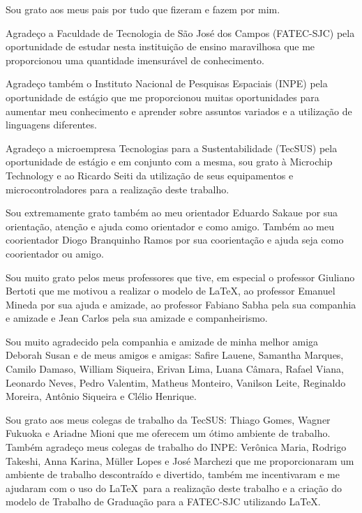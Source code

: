 \begin{agradecimentos}
\par Sou grato aos meus pais por tudo que fizeram e fazem por mim.
\par Agrade\c{c}o a Faculdade de Tecnologia de S\~ao Jos\'e dos Campos (FATEC-SJC) pela oportunidade de estudar nesta institui\c{c}\~ao de ensino maravilhosa que me proporcionou uma quantidade imensur\'avel de conhecimento.

\par Agrade\c{c}o tamb\'em o Instituto Nacional de Pesquisas Espaciais (INPE) pela oportunidade de est\'agio que me proporcionou muitas oportunidades para aumentar meu conhecimento e aprender sobre assuntos variados e a utiliza\c{c}\~ao de linguagens diferentes.

\par Agrade\c{c}o a microempresa Tecnologias para a Sustentabilidade (TecSUS) pela oportunidade de est\'agio e em conjunto com a mesma, sou grato \`a Microchip Technology e ao Ricardo Seiti da utiliza\c{c}\~ao de seus equipamentos e microcontroladores para a realiza\c{c}\~ao deste trabalho.

\par Sou extremamente grato tamb\'em ao meu orientador Eduardo Sakaue por sua orienta\c{c}\~ao, aten\c{c}\~ao e ajuda como orientador e como amigo. Tamb\'em ao meu coorientador Diogo Branquinho Ramos por sua coorienta\c{c}\~ao e ajuda seja como coorientador ou amigo.

\par Sou muito grato pelos meus professores que tive, em especial o professor Giuliano Bertoti que me motivou a realizar o modelo de \LaTeX, ao professor Emanuel Mineda por sua ajuda e amizade, ao professor Fabiano Sabha pela sua companhia e amizade e Jean Carlos pela sua amizade e companheirismo.

\par Sou muito agradecido pela companhia e amizade de minha melhor amiga Deborah Susan e de meus amigos e amigas: Safire Lauene, Samantha Marques, Camilo Damaso, William Siqueira, Erivan Lima, Luana C\^amara, Rafael Viana, Leonardo Neves, Pedro Valentim, Matheus Monteiro, Vanilson Leite, Reginaldo Moreira, Antônio Siqueira e Clélio Henrique.

\par Sou grato aos meus colegas de trabalho da TecSUS: Thiago Gomes, Wagner Fukuoka e Ariadne Mioni que me oferecem um \'otimo ambiente de trabalho. Tamb\'em agrade\c{c}o meus colegas de trabalho do INPE: Ver\^onica Maria, Rodrigo Takeshi, Anna Karina, M\"uller Lopes e Jos\'e Marchezi que me proporcionaram um ambiente de trabalho descontra\'ido e divertido, tamb\'em me incentivaram e me ajudaram com o uso do \LaTeX\ para a realiza\c{c}\~ao deste trabalho e a cria\c{c}\~ao do modelo de Trabalho de Gradua\c{c}\~ao para a FATEC-SJC utilizando \LaTeX.

\end{agradecimentos}